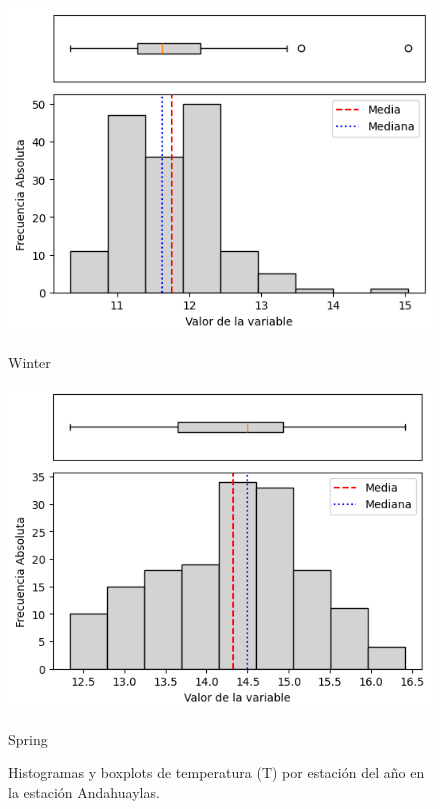 \begin{figure}[H]
\begin{minipage}{0.30\textwidth}
  \includegraphics[width=\linewidth]{resultados/por_estacion_del_anio/boxplot_clases_por_estacion/Andahuaylas/T_HistBoxplot_Winter.png}
  \caption*{Winter}
\end{minipage}
\hfill
\begin{minipage}{0.30\textwidth}
  \includegraphics[width=\linewidth]{resultados/por_estacion_del_anio/boxplot_clases_por_estacion/Andahuaylas/T_HistBoxplot_Spring.png}
  \caption*{Spring}
\end{minipage}
\caption{Histogramas y boxplots de temperatura (T) por estación del año en la estación Andahuaylas.}
\label{fig:andahuaylas_t_hist}
\end{figure}

